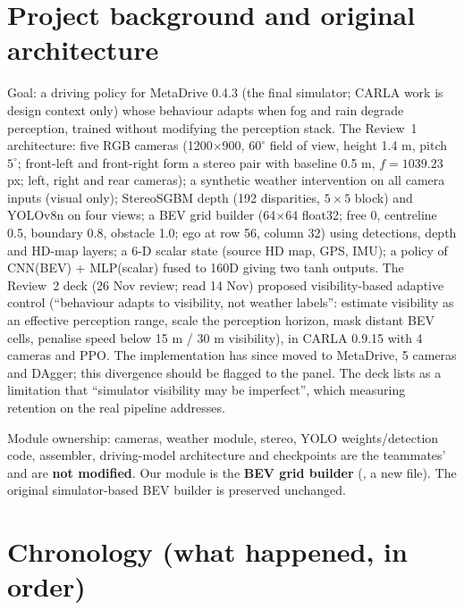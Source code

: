 \documentclass[10.5pt,a4paper]{article}
\newcommand{\code}[1]{\texttt{\detokenize{#1}}}
\begin{document}
\section{Project background and original architecture}
Goal: a driving policy for MetaDrive 0.4.3 (the final simulator; CARLA work is design context only) whose behaviour adapts when fog and rain degrade perception, trained without modifying the perception stack. The Review~1 architecture: five RGB cameras (1200$\times$900, $60^\circ$ field of view, height 1.4 m, pitch $5^\circ$; front-left and front-right form a stereo pair with baseline 0.5 m, $f=1039.23$ px; left, right and rear cameras); a synthetic weather intervention on all camera inputs (visual only); StereoSGBM depth (192 disparities, $5\times5$ block) and YOLOv8n on four views; a BEV grid builder (64$\times$64 float32; free 0, centreline 0.5, boundary 0.8, obstacle 1.0; ego at row 56, column 32) using detections, depth and HD-map layers; a 6-D scalar state (source HD map, GPS, IMU); a policy of CNN(BEV) + MLP(scalar) fused to 160D giving two tanh outputs. The Review~2 deck (26 Nov review; read 14 Nov) proposed visibility-based adaptive control (``behaviour adapts to visibility, not weather labels'': estimate visibility as an effective perception range, scale the perception horizon, mask distant BEV cells, penalise speed below 15 m / 30 m visibility), in CARLA 0.9.15 with 4 cameras and PPO. The implementation has since moved to MetaDrive, 5 cameras and DAgger; this divergence should be flagged to the panel. The deck lists as a limitation that ``simulator visibility may be imperfect'', which measuring retention on the real pipeline addresses.

Module ownership: cameras, weather module, stereo, YOLO weights/detection code, assembler, driving-model architecture and checkpoints are the teammates' and are \textbf{not modified}. Our module is the \textbf{BEV grid builder} (\code{bev_state/camera_grid_builder.py}, a new file). The original simulator-based BEV builder is preserved unchanged.

\section{Chronology (what happened, in order)}
\end{document}
